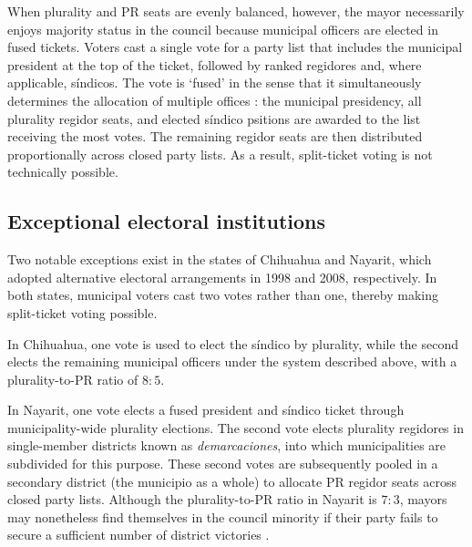 \documentclass[letter,12pt]{article}
\begin{document}
When plurality and PR seats are evenly balanced, however, the mayor necessarily enjoys majority status in the council because municipal officers are elected in fused tickets. Voters cast a single vote for a party list that includes the municipal president at the top of the ticket, followed by ranked regidores and, where applicable, síndicos. The vote is `fused' in the sense that it simultaneously determines the allocation of multiple offices \citep[see ][:42]{cox.1997}: the municipal presidency, all plurality regidor seats, and elected síndico psitions are awarded to the list receiving the most votes. The remaining regidor seats are then distributed proportionally across closed party lists. As a result, split-ticket voting is not technically possible.

\subsection{Exceptional electoral institutions}
Two notable exceptions exist in the states of Chihuahua and Nayarit, which adopted alternative electoral arrangements in 1998 and 2008, respectively. In both states, municipal voters cast two votes rather than one, thereby making split-ticket voting possible.

In Chihuahua, one vote is used to elect the síndico by plurality, while the second elects the remaining municipal officers under the system described above, with a plurality-to-PR ratio of $8:5$.

In Nayarit, one vote elects a fused president and síndico ticket through municipality-wide plurality elections. The second vote elects plurality regidores in single-member districts known as \emph{demarcaciones}, into which municipalities are subdivided for this purpose. These second votes are subsequently pooled in a secondary district (the municipio as a whole) to allocate PR regidor seats across closed party lists. Although the plurality-to-PR ratio in Nayarit is $7:3$, mayors may nonetheless find themselves in the council minority if their party fails to secure a sufficient number of district victories \citep{lucardi.magar.2019}.
\end{document}
